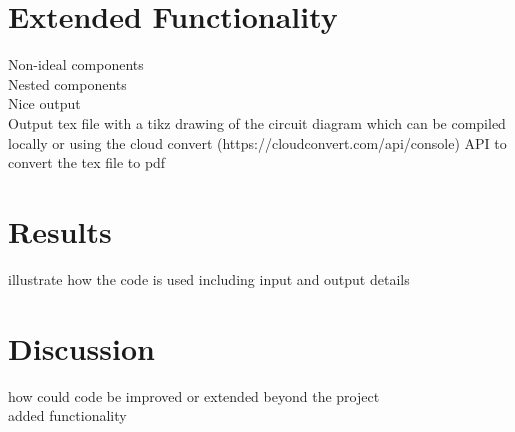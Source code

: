 \documentclass[10pt,a4paper,twoside]{article}
\begin{document}
\begin{multicols}{2}
    \section*{Extended Functionality}
    Non-ideal components\\
    Nested components\\
    Nice output\\
    Output tex file with a tikz drawing of the circuit diagram which can be compiled locally or using the cloud convert (https://cloudconvert.com/api/console) API to convert the tex file to pdf

    \section*{Results}
    illustrate how the code is used including input and output details

    \section*{Discussion}
    how could code be improved or extended beyond the project\\
    added functionality

    \begin{thebibliography}{9}




    \end{thebibliography}
  \end{multicols}
\end{document}

